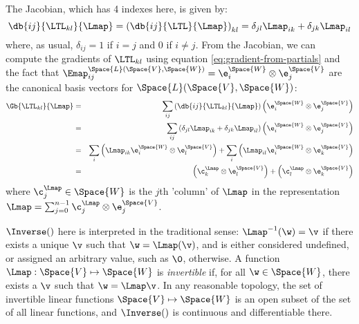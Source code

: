 The Jacobian, which has 4 indexes here, is given by:
\begin{equation}
\db{ij}{\LTL_{kl}}{\Lmap}
 =
\left( \db{ij}{\LTL}{\Lmap} \right)_{kl}
=
\delta_{jl} \Lmap_{ik}
+
\delta_{jk} \Lmap_{il}
\end{equation}
where, as usual, $\delta_{ij} = 1$ if $i=j$ and  $0$ if $i \neq j$.
From the Jacobian, we can compute the gradients of $\LTL_{kl}$
using equation \ref{eq:gradient-from-partials}
and the fact that
$\Emap_{ij}^{\Space{L}(\Space{V},\Space{W})}  = \e_i^{\Space{W}} \otimes \e_j^{\Space{V}}$
are the canonical basis vectors for $\Space{L}(\Space{V},\Space{W})$:
\begin{eqnarray}
\Gb{\LTL_{kl}}{\Lmap}
& = &
\sum_{ij}
\left( \db{ij}{\LTL_{kl}}{\Lmap} \right)
\left( \e_i^{\Space{W}} \otimes \e_j^{\Space{V}} \right)
\\
& = &
\sum_{ij}
\left( \delta_{jl} \Lmap_{ik} + \delta_{jk} \Lmap_{il} \right)
\left( \e_i^{\Space{W}} \otimes \e_j^{\Space{V}} \right)
\nonumber
\\
& = &
\sum_{i}
\left(
\Lmap_{ik}  \e_i^{\Space{W}} \otimes \e_l^{\Space{V}}
\right)
+
\sum_{i}
\left(
\Lmap_{il}  \e_i^{\Space{W}} \otimes \e_k^{\Space{V}}
\right)
\nonumber
\\
& = &
\left(
\c_k^{\Lmap} \otimes \e_l^{\Space{V}}
\right)
+
\left(
\c_l^{\Lmap} \otimes \e_k^{\Space{V}}
\right)
\nonumber
\end{eqnarray}
where $\c_j^{\Lmap} \in \Space{W}$ is the $j$th 'column' of $\Lmap$
in the representation
$\Lmap = \sum_{j=0}^{n-1} \c_j^{\Lmap} \otimes \e_j^{\Space{V}}$.

\label{sec:Derivative-of-inverse}

$\Inverse()$ here is interpreted in the traditional sense:
$\Lmap^{-1}(\w) = \v$ if there exists a unique $\v$ such that $\w = \Lmap(\v)$,
and is either considered undefined, or assigned an arbitrary
value, such as $\0$, otherwise.
A function $\Lmap : \Space{V} \mapsto \Space{W}$ is \textit{invertible}
if, for all $\w \in \Space{W}$, there exists a $\v$ such that
$\w = \Lmap \v$.
In any reasonable topology,
the set of invertible linear functions $\Space{V} \mapsto \Space{W}$
is an open subset of the set of all linear functions,
and $\Inverse()$ is continuous and differentiable there.

